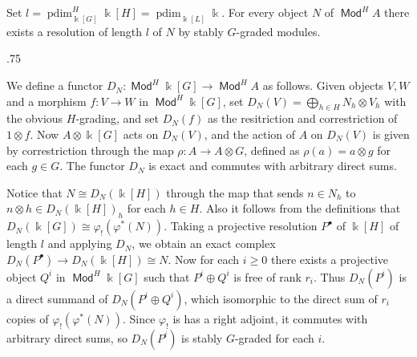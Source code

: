 \documentclass[11pt,fleqn]{article}
\makeatletter
\renewenvironment{proof}[1][\textit{Proof}]{\par
  \pushQED{\qed}%
  \normalfont \topsep.75\paraskip\relax
  \trivlist
  \item[\hskip\labelsep
        \itshape
    #1\@addpunct{.}]\ignorespaces
}{%
  \popQED\endtrivlist\@endpefalse
}
\newcommand\ot{\otimes}
\renewcommand\to{\longrightarrow}
\renewcommand\phi{\varphi}
\renewcommand\k{\Bbbk}
\DeclareMathOperator\Mod{\mathsf{Mod}}
\DeclareMathOperator\projdim{pdim}
\makeatother
\begin{document}
\begin{Proposition*}
Set $l = \projdim_{\k[G]}^H \k[H] = \projdim_{\k[L]} \k$.
For every object $N$ of $\Mod^H A$ there exists a resolution of length $l$ of 
$N$ by stably $G$-graded modules.
\end{Proposition*}
\begin{proof}
We define a functor $D_N: \Mod^H \k[G] \to \Mod^H A$ as follows. Given
objects $V, W$ and a morphism $f: V \to W$ in $\Mod^H \k[G]$, set 
$D_N(V) = \bigoplus_{h \in H} N_h \ot V_h$ with the obvious $H$-grading,
and set $D_N(f)$ as the resitriction and correstriction of $1 \ot f$.
Now $A \ot \k[G]$ acts on $D_N(V)$, and the action of $A$ on $D_N(V)$ is
given by correstriction through the map $\rho: A \to A \ot G$, defined as
$\rho(a) = a \ot g$ for each $g \in G$. The functor $D_N$ is exact and 
commutes with arbitrary direct sums. 

Notice that $N \cong D_N(\k[H])$ through the map that sends $n \in N_h$ to
$n \ot h \in D_N(\k[H])_h$ for each $h \in H$. Also it follows from the
definitions that $D_N(\k[G]) \cong \phi_!(\phi^*(N))$. Taking a projective
resolution $P^\bullet$ of $\k[H]$ of length $l$ and applying $D_N$, we obtain
an exact complex $D_N(P^\bullet) \to D_N(\k[H]) \cong N$. Now for each $i 
\geq 0$ there exists a projective object $Q^i$ in $\Mod^H \k[G]$ such that
$P^i \oplus Q^i$ is free of rank $r_i$. Thus $D_N(P^i)$ is a direct summand
of $D_N(P^i \oplus Q^i)$, which isomorphic to the direct sum of $r_i$ copies
of $\phi_!(\phi^*(N))$. Since $\phi_!$ is has a right adjoint, it commutes 
with arbitrary direct sums, so $D_N(P^i)$ is stably $G$-graded for each $i$.
\end{proof}
\end{document}
